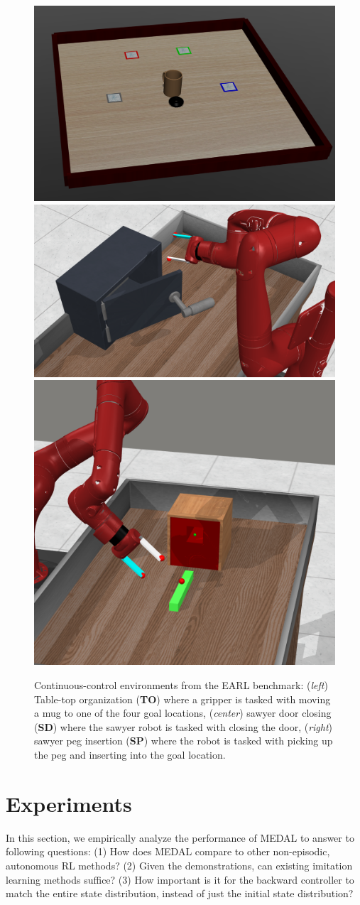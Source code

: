 \documentclass[nohyperref]{article}
\theoremstyle{plain}
\theoremstyle{definition}
\theoremstyle{remark}
\begin{document}
\begin{figure}[t]
    \centering
    \includegraphics[height=0.19\textwidth]{figures/tabletop.png}
    \includegraphics[height=0.19\textwidth]{figures/sawyerdoor.png}
    \includegraphics[height=0.19\textwidth]{figures/sawyerpeg.png}
    \caption{Continuous-control environments from the EARL benchmark: (\emph{left}) Table-top organization (\textbf{TO}) where a gripper is tasked with moving a mug to one of the four goal locations, (\emph{center}) sawyer door closing (\textbf{SD}) where the sawyer robot is tasked with closing the door, (\emph{right}) sawyer peg insertion (\textbf{SP}) where the robot is tasked with picking up the peg and inserting into the goal location.}
    \label{fig:env_images}
\end{figure}

\section{Experiments}
\label{sec:experiments}

In this section, we empirically analyze the performance of MEDAL to answer to following questions: (1) How does MEDAL compare to other non-episodic, autonomous RL methods? (2) Given the demonstrations, can existing imitation learning methods suffice? (3) How important is it for the backward controller to match the entire state distribution, instead of just the initial state distribution? 
\end{document}
